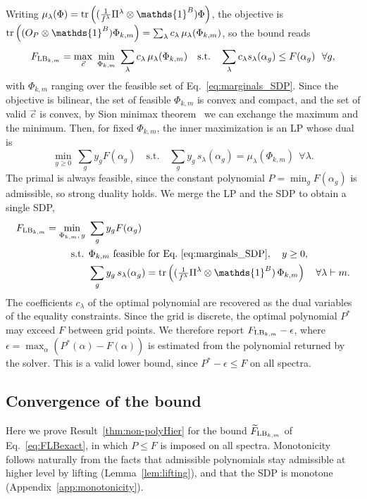 \documentclass[aps,pra,twocolumn,showpacs,superscriptaddress,groupedaddress]{revtex4-2}
\newcommand{\one}[0]{\mathds{1}}
\renewcommand{\a}{\alpha}
\newcommand{\I}{\one}
\begin{document}
\begin{widetext}
Writing $\mu_\lambda(\Phi)=\tr\left((\tfrac{1}{f^\lambda}\Pi^\lambda\otimes\I^B)\Phi\right)$, the objective is $\tr\left((O_P\otimes\I^B)\Phi_{k,m}\right)=\sum_\lambda c_\lambda\,\mu_\lambda(\Phi_{k,m})$, so the bound reads
\begin{equation}
    F_{{\rm LB}_{k,m}}=\max_{\vec c}\ \min_{\Phi_{k,m}}\ \sum_\lambda c_\lambda\,\mu_\lambda(\Phi_{k,m})
    \quad\text{s.t.}\quad \sum_\lambda c_\lambda s_\lambda(\a_g)\leq F(\a_g)\ \ \forall g,
\end{equation}
with $\Phi_{k,m}$ ranging over the feasible set of Eq.~\eqref{eq:marginals_SDP}. Since the objective is bilinear, the set of feasible $\Phi_{k,m}$ is convex and compact, and the set of valid $\vec{c}$ is convex, by Sion minimax theorem~\cite{Sion1958} we can exchange the maximum and the minimum. Then, for fixed $\Phi_{k,m}$, the inner maximization is an LP whose dual is
\begin{equation}
    \min_{y\geq0}\ \sum_g y_g F(\a_g)\quad\text{s.t.}\quad \sum_g y_g\,s_\lambda(\a_g)=\mu_\lambda(\Phi_{k,m})\ \ \forall\lambda .
\end{equation}
The primal is always feasible, since the constant polynomial $P=\min_gF(\a_g)$ is admissible, so strong duality holds. We merge the LP and the SDP to obtain a single SDP,
\begin{align}
    F_{{\rm LB}_{k,m}}=\min_{\Phi_{k,m},\,y}\ & \sum_g y_g F(\a_g)\\
    \text{s.t. }& \Phi_{k,m}\ \text{feasible for Eq.~\eqref{eq:marginals_SDP}},\quad y\geq0, \nonumber\\
    & \sum_g y_g\,s_\lambda(\a_g)=\tr\left((\tfrac{1}{f^\lambda}\Pi^\lambda\otimes\I^B)\,\Phi_{k,m}\right)\quad\forall\lambda\vdash m. \nonumber
\end{align}
The coefficients $c_\lambda$ of the optimal polynomial are recovered as the dual variables of the equality constraints. Since the grid is discrete, the optimal polynomial $P^*$ may exceed $F$ between grid points. We therefore report $F_{{\rm LB}_{k,m}}-\epsilon$, where $\epsilon=\max_\a\left(P^*(\a)-F(\a)\right)$ is estimated from the polynomial returned by the solver. This is a valid lower bound, since $P^*-\epsilon\leq F$ on all spectra. 

\subsection{Convergence of the bound}\label{app:LPconvergence}
Here we prove Result~\ref{thm:non-polyHier} for the bound $\widetilde F_{{\rm LB}_{k,m}}$ of Eq.~\eqref{eq:FLBexact}, in which $P\leq F$ is imposed on all spectra. Monotonicity follows naturally from the facts that admissible polynomials stay admissible at higher level by lifting (Lemma~\ref{lem:lifting}), and that the SDP is monotone (Appendix~\ref{app:monotonicity}).


\end{widetext}
\end{document}
